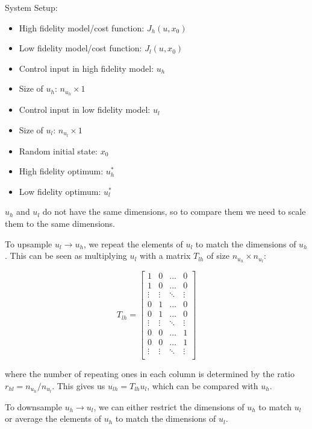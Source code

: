 \documentclass{article}
\begin{document}
System Setup:
\begin{itemize}
  \item High fidelity model/cost function: $J_h(u, x_0)$
  \item Low fidelity model/cost function: $J_l(u, x_0)$
  \item Control input in high fidelity model: $u_h$
  \item Size of $u_h$: $n_{u_h} \times 1$
  \item Control input in low fidelity model: $u_l$
  \item Size of $u_l$: $n_{u_l} \times 1$
  \item Random initial state: $x_0$
  \item High fidelity optimum: $u_h^*$
  \item Low fidelity optimum: $u_l^*$
\end{itemize}

$u_h$ and $u_l$ do not have the same dimensions, so to compare them we need to scale them to the same dimensions.

To upsample $u_l \rightarrow u_h$, we repeat the elements of $u_l$ to match the dimensions of $u_h$.
This can be seen as multiplying $u_l$ with a matrix $T_{lh}$ of size $n_{u_h} \times n_{u_l}$:

\begin{equation}
  T_{lh} =
  \begin{bmatrix}
    1 & 0 & \ldots & 0 \\
    1 & 0 & \ldots & 0 \\
    \vdots & \vdots & \ddots & \vdots \\
    0 & 1 & \ldots & 0 \\
    0 & 1 & \ldots & 0 \\
    \vdots & \vdots & \ddots & \vdots \\
    0 & 0 & \ldots & 1 \\
    0 & 0 & \ldots & 1 \\
    \vdots & \vdots & \ddots & \vdots \\
  \end{bmatrix}
\end{equation}

where the number of repeating ones in each column is determined by the ratio $r_{hl} = n_{u_h} / n_{u_l}$.
This gives us $u_{lh} = T_{lh} u_l$, which can be compared with $u_h$.

To downsample $u_h \rightarrow u_l$, we can either restrict the dimensions of $u_h$ to match $u_l$ or average the elements of $u_h$ to match the dimensions of $u_l$.
\end{document}
